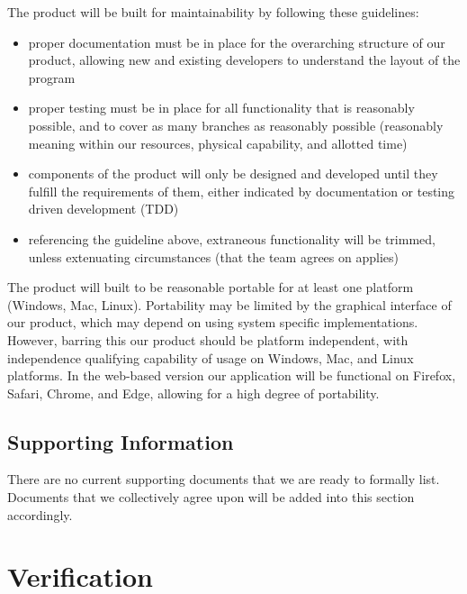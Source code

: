 \documentclass[10pt,letter,draftclsnofoot,onecolumn]{IEEEtran}
\begin{document}
\begin{singlespace}
        
        The product will be built for maintainability by following these guidelines:
        \begin{itemize}
            \item proper documentation must be in place for the overarching structure of our product, allowing new and existing developers to understand the layout of the program
            \item proper testing must be in place for all functionality that is reasonably possible, and to cover as many branches as reasonably possible (reasonably meaning within our resources, physical capability, and allotted time)
            \item components of the product will only be designed and developed until they fulfill the requirements of them, either indicated by documentation or testing driven development (TDD)
            \item referencing the guideline above, extraneous functionality will be trimmed, unless extenuating circumstances (that the team agrees on applies)
        \end{itemize}
        
        
        The product will built to be reasonable portable for at least one platform (Windows, Mac, Linux). Portability may be limited by the graphical interface of our product, which may depend on using system specific implementations. However, barring this our product should be platform independent, with independence qualifying capability of usage on Windows, Mac, and Linux platforms. In the web-based version our application will be functional on Firefox, Safari, Chrome, and Edge, allowing for a high degree of portability.
    \subsection{Supporting Information}
        There are no current supporting documents that we are ready to formally list. Documents that we collectively agree upon will be added into this section accordingly.

\section{Verification}

    

\end{singlespace}
\end{document}
